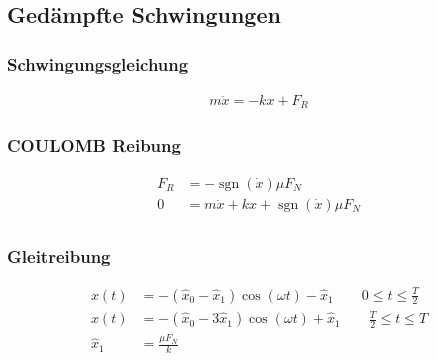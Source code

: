 \subsection{Gedämpfte Schwingungen}

\begin{multicols}{2}{}
\subsubsection*{Schwingungsgleichung}
\begin{align*}
m\ddot{x}=-kx+F_R
\end{align*}
\hfill

\subsubsection*{COULOMB Reibung}
\begin{align*}
F_R&=-\operatorname{sgn}({\dot{x}})\mu F_N\\
0&=m\ddot{x}+kx+\operatorname{sgn}({\dot{x}})\mu F_N\\
\end{align*}
\end{multicols}


\subsubsection*{Gleitreibung}
\begin{align*}
x(t)&=-(\hat{x}_0-\hat{x}_1)\cos(\omega t)-\hat{x}_1\qquad 0\leq t\leq \frac{T}{2}\\
x(t)&=-(\hat{x}_0-3\hat{x}_1)\cos(\omega t)+\hat{x}_1\qquad \frac{T}{2}\leq t\leq T\\
\hat{x}_1&=\frac{\mu F_N}{k}
\end{align*}


